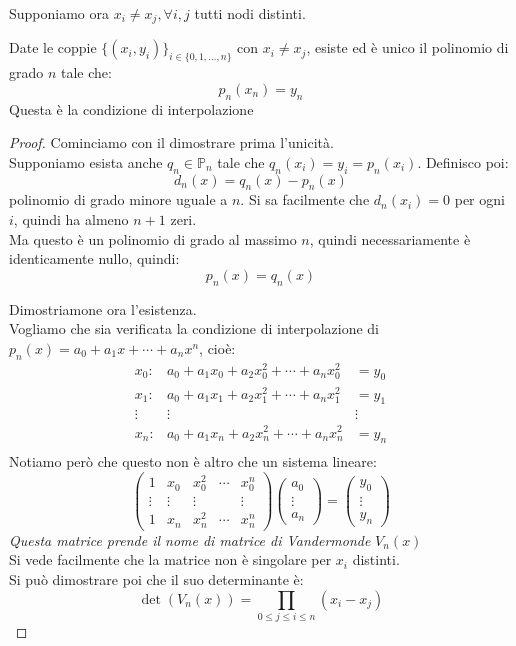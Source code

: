 \documentclass[11pt,a4paper,twoside]{article}
\theoremstyle{definition}
\begin{document}
Supponiamo ora $x_i \neq x_j, \forall i,j$ tutti nodi distinti.

\begin{thm}{}{}
	Date le coppie $\{(x_i, y_i)\}_{i \in \{0,1,...,n\}}$ con $x_i \neq x_j$, esiste ed è unico il polinomio di grado $n$ tale che:
	\[ p_n(x_n) = y_n \]
	Questa è la condizione di interpolazione
\end{thm}

\begin{proof}
	Cominciamo con il dimostrare prima l'unicità.\\
	Supponiamo esista anche $q_n \in \mathbb P_n$ tale che $q_n(x_i) = y_i = p_n(x_i)$. Definisco poi:
	\[ d_n(x) = q_n(x) - p_n(x) \]
	polinomio di grado minore uguale a $n$. Si sa facilmente che $d_n(x_i) = 0$ per ogni $i$, quindi ha almeno $n+1$ zeri.\\
	Ma questo è un polinomio di grado al massimo $n$, quindi necessariamente è identicamente nullo, quindi:
	\[ p_n(x) = q_n(x) \]

	Dimostriamone ora l'esistenza.\\
	Vogliamo che sia verificata la condizione di interpolazione di $p_n(x) = a_0 + a_1x + \cdots + a_nx^n$, cioè:
	\[
		\begin{matrix}
			x_0: & a_0 + a_1x_0 + a_2x_0^2 + \cdots + a_nx_0^2 &= y_0\\
			x_1: & a_0 + a_1x_1 + a_2x_1^2 + \cdots + a_nx_1^2 &= y_1\\
			\vdots & \vdots & \vdots\\
			x_n: & a_0 + a_1x_n + a_2x_n^2 + \cdots + a_nx_n^2 &= y_n\\
		\end{matrix}
	\]
	Notiamo però che questo non è altro che un sistema lineare:
	\[
		\begin{pmatrix}
			1 & x_0 & x_0^2 & \cdots & x_0^n\\
			\vdots & \vdots & \vdots & & \vdots\\
			1 & x_n & x_n^2 & \cdots & x_n^n
		\end{pmatrix}
		\begin{pmatrix}a_0\\ \vdots \\ a_n\end{pmatrix} = \begin{pmatrix}y_0 \\ \vdots \\ y_n\end{pmatrix}
	\]
	\textit{Questa matrice prende il nome di matrice di Vandermonde }$V_n(x)$\\
	Si vede facilmente che la matrice non è singolare per $x_i$ distinti.\\
	Si può dimostrare poi che il suo determinante è:
	\[\det (V_n(x)) = \prod_{0\leq j \leq i\leq n}(x_i - x_j)\]
\end{proof}
\end{document}
